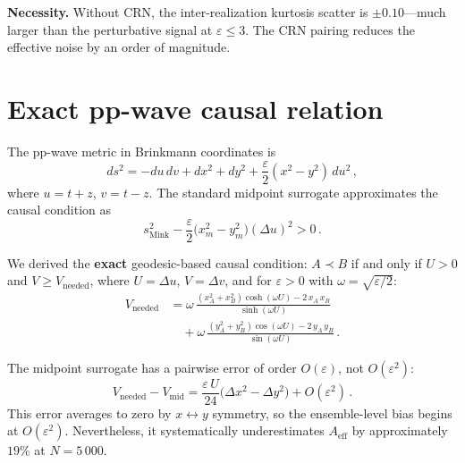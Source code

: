 \documentclass[11pt,a4paper]{article}
\begin{document}
\noindent
\textbf{Necessity.}\;
Without CRN, the inter-realization kurtosis scatter is $\pm 0.10$---much larger than the
perturbative signal at $\varepsilon \le 3$.  The CRN pairing reduces the effective noise
by an order of magnitude.

\section{Exact pp-wave causal relation}
\label{sec:exact}

The pp-wave metric in Brinkmann coordinates is
\begin{equation}
  ds^{2} = -du\,dv + dx^{2} + dy^{2}
  + \frac{\varepsilon}{2}(x^{2} - y^{2})\,du^{2}\,,
  \label{eq:ppwave}
\end{equation}
where $u = t + z$, $v = t - z$.  The standard midpoint surrogate approximates the causal
condition as
\begin{equation}
  s^{2}_{\mathrm{Mink}}
  - \frac{\varepsilon}{2}\bigl(x_{m}^{2} - y_{m}^{2}\bigr)(\Delta u)^{2} > 0\,.
  \label{eq:midpoint}
\end{equation}

We derived the \textbf{exact} geodesic-based causal condition:
$A \prec B$ if and only if $U > 0$ and $V \ge V_{\mathrm{needed}}$, where $U = \Delta u$,
$V = \Delta v$, and for $\varepsilon > 0$ with $\omega = \sqrt{\varepsilon/2}$:
\begin{equation}
\begin{aligned}
  V_{\mathrm{needed}} &= \omega\,
    \frac{(x_{A}^{2} + x_{B}^{2})\cosh(\omega U) - 2\,x_{A}\,x_{B}}
         {\sinh(\omega U)} \\
  &\quad + \omega\,
    \frac{(y_{A}^{2} + y_{B}^{2})\cos(\omega U) - 2\,y_{A}\,y_{B}}
         {\sin(\omega U)}\,.
\end{aligned}
\label{eq:Vneeded}
\end{equation}

The midpoint surrogate has a pairwise error of order $O(\varepsilon)$, not $O(\varepsilon^{2})$:
\begin{equation}
  V_{\mathrm{needed}} - V_{\mathrm{mid}}
  = \frac{\varepsilon\,U}{24}\bigl(\Delta x^{2} - \Delta y^{2}\bigr) + O(\varepsilon^{2})\,.
  \label{eq:midpoint_error}
\end{equation}
This error averages to zero by $x \leftrightarrow y$ symmetry, so the ensemble-level bias
begins at $O(\varepsilon^{2})$.  Nevertheless, it systematically underestimates $A_{\mathrm{eff}}$
by approximately~$19\%$ at $N = 5\,000$.
\end{document}
